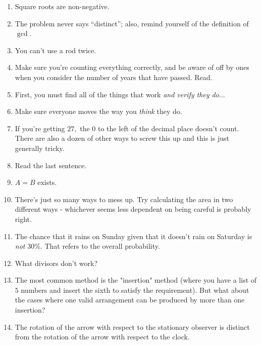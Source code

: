 \documentclass[mast]{lucky}
\begin{document}
\begin{enumerate}
    
    \item Square roots are non-negative.
    
    \item The problem never says ``distinct''; also, remind yourself of the definition of $\gcd$.
    
    \item You can't use a rod twice.
	
    \item Make sure you're counting everything correctly, and be aware of off by ones when you consider the number of years that have passed. Read.

    \item First, you must find all of the things that work \emph{and verify they do}...
    
    \item Make sure everyone moves the way you \textit{think} they do.

    \item If you're getting $27,$ the $0$ to the left of the decimal place doesn't count. There are also a dozen of other ways to screw this up and this is just generally tricky.
    
    \item Read the last sentence.
    
    \item $A=B$ exists.
    
    \item There's just so many ways to mess up. Try calculating the area in two different ways - whichever seems less dependent on being careful is probably right.
    
    \item The chance that it rains on Sunday given that it doesn't rain on Saturday is \emph{not} $30\%.$ That refers to the overall probability.
    
    \item What divisors don't work?
    
    \item The most common method is the "insertion" method (where you have a list of $5$ numbers and insert the sixth to satisfy the requirement). But what about the cases where one valid arrangement can be produced by more than one insertion?
    
    \item The rotation of the arrow with respect to the stationary observer is distinct from the rotation of the arrow with respect to the clock.
    

\end{enumerate}
\end{document}
